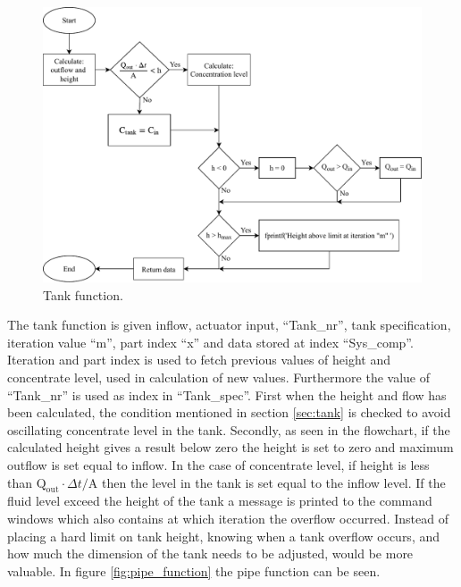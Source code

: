 \begin{figure}[H]
\centering
\includegraphics[width=0.95 \textwidth]{report/simulation/pictures/tank_function.pdf}
\caption{Tank function.}
\label{fig:tank_function}
\end{figure}

The tank function is given inflow, actuator input, ``Tank\_nr'', tank specification, iteration value ``m'', part index ``x'' and data stored at index ``Sys\_comp''. Iteration and part index is used to fetch previous values of height and concentrate level, used in calculation of new values. Furthermore the value of ``Tank\_nr'' is used as index in ``Tank\_spec''.
First when the height and flow has been calculated, the condition mentioned in section \ref{sec:tank} is checked to avoid oscillating concentrate level in the tank. %
Secondly, as seen in the flowchart, if the calculated height gives a result below zero the height is set to zero and maximum outflow is set equal to inflow. In the case of concentrate level, if height is less than $\text{Q}_\text{out} \cdot \Delta t / \text{A}$ then the level in the tank is set equal to the inflow level. If the fluid level exceed the height of the tank a message is printed to the command windows which also contains at which iteration the overflow occurred. Instead of placing a hard limit on tank height, knowing when a tank overflow occurs, and how much the dimension of the tank needs to be adjusted, would be more valuable. 
In figure \ref{fig:pipe_function} the pipe function can be seen.

